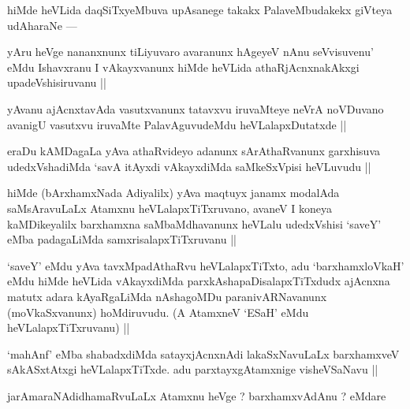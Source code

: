 \begin{artha}
hiMde heVLida daqSiTxyeMbuva upAsanege takakx PalaveMbudakekx giVteya udAharaNe ---
\end{artha}

\begin{artha}
yAru heVge  nananxnunx tiLiyuvaro avaranunx hAgeyeV nAnu seVvisuvenu' eMdu Ishavxranu I vAkayxvanunx hiMde heVLida athaRjAcnxnakAkxgi upadeVshisiruvanu ||
\end{artha}

\begin{artha}
yAvanu ajAcnxtavAda vasutxvanunx tatavxvu iruvaMteye neVrA noVDuvano avanigU vasutxvu iruvaMte PalavAguvudeMdu heVLalapxDutatxde ||
\end{artha}


\begin{artha}
eraDu kAMDagaLa yAva athaRvideyo adanunx sArAthaRvanunx garxhisuva udedxVshadiMda `savA itAyxdi vAkayxdiMda saMkeSxVpisi heVLuvudu ||
\end{artha}


\begin{artha}
hiMde (bArxhamxNada Adiyalilx) yAva maqtuyx janamx modalAda saMsAravuLaLx Atamxnu heVLalapxTiTxruvano, avaneV I koneya kaMDikeyalilx barxhamxna saMbaMdhavanunx heVLalu udedxVshisi `saveY' eMba padagaLiMda samxrisalapxTiTxruvanu ||
\end{artha}


\begin{artha}
`saveY' eMdu yAva tavxMpadAthaRvu heVLalapxTiTxto, adu `barxhamxloVkaH' eMdu hiMde heVLida vAkayxdiMda parxkAshapaDisalapxTiTxdudx ajAcnxna matutx adara kAyaRgaLiMda nAshagoMDu paranivARNavanunx (moVkaSxvanunx) hoMdiruvudu. (A AtamxneV `ESaH' eMdu heVLalapxTiTxruvanu) ||
\end{artha}

\begin{artha}
`mahAnf' eMba shabadxdiMda satayxjAcnxnAdi lakaSxNavuLaLx barxhamxveV sAkASxtAtxgi heVLalapxTiTxde. adu parxtayxgAtamxnige visheVSaNavu ||
\end{artha}

\begin{artha}
jarAmaraNAdidhamaRvuLaLx Atamxnu heVge ? barxhamxvAdAnu ? eMdare 
\end{artha}


